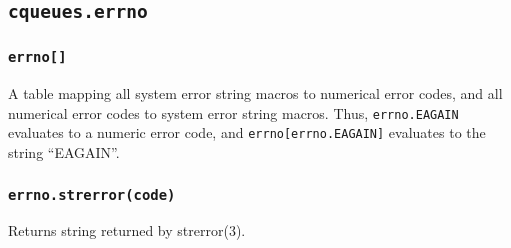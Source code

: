 \documentclass[11pt, oneside]{memoir}
\newcommand*{\fn}[1]{\texttt{#1}\xspace}
\newcounter{toccols}
\newenvironment{Module}[1]{
	\subsection{\texttt{#1}}
	\addtocontents{toc}{
		\protect\begin{multicols}{\value{toccols}}
	}
}{
	\addtocontents{toc}{\protect\end{multicols}}
}
\begin{document}
\begin{Module}{cqueues.errno}

\subsubsection[\fn{errno[]}]{\fn{errno[]}}
A table mapping all system error string macros to numerical error codes, and all numerical error codes to system error string macros. Thus, \texttt{errno.EAGAIN} evaluates to a numeric error code, and \texttt{errno[errno.EAGAIN]} evaluates to the string ``EAGAIN''.

\subsubsection[\fn{errno.strerror}]{\fn{errno.strerror(code)}}
Returns string returned by strerror(3).

\end{Module}
\end{document}
